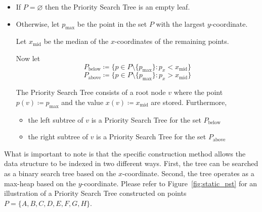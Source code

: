 \documentclass[twoside,11pt,openright]{report}
\begin{document}
\begin{itemize}
	\item If $P = \varnothing$ then the Priority Search Tree is an empty leaf.
	\item Otherwise, let $p_\text{max}$ be the point in the set $P$ with the largest $y$-coordinate.
	
			Let $x_{\text{mid}}$ be the median of the $x$-coordinates of the remaining points.
			
			Now let
			$$ P_\text{below} \coloneqq \{p \in P \setminus \{p_\text{max} \} : p_x < x_\text{mid} \}$$
			$$ P_\text{above} \coloneqq \{p \in P \setminus \{p_\text{max} \} : p_x > x_\text{mid} \}$$
			
			The Priority Search Tree consists of a root node $v$ where the point \\
			$p(v) \coloneqq p_{\text{max}}$ and the value $x(v) \coloneqq x_{\text{mid}}$ are stored. Furthermore,
			\begin{itemize}[label=$\bullet$]
				\item the left subtree of $v$ is a Priority Search Tree for the set $P_{\text{below}}$
				\item the right subtree of $v$ is a Priority Search Tree for the set $P_{\text{above}}$
			\end{itemize}
\end{itemize}

What is important to note is that the specific construction method allows the data structure to be indexed in two different ways. First, the tree can be searched as a binary search tree based on the $x$-coordinate. Second, the tree operates as a max-heap based on the $y$-coordinate. Please refer to Figure~\ref{fig:static_pst} for an illustration of a Priority Search Tree constructed on points $P = \{A, B, C, D, E, F, G, H\}$.
\end{document}
